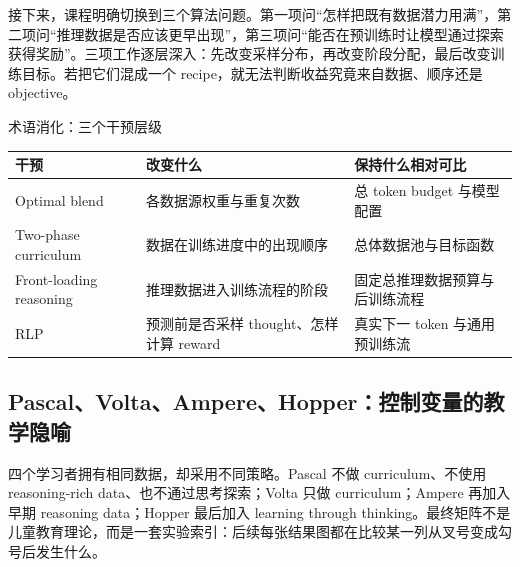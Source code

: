 
接下来，课程明确切换到三个算法问题。第一项问“怎样把既有数据潜力用满”，第二项问“推理数据是否应该更早出现”，第三项问“能否在预训练时让模型通过探索获得奖励”。三项工作逐层深入：先改变采样分布，再改变阶段分配，最后改变训练目标。若把它们混成一个 recipe，就无法判断收益究竟来自数据、顺序还是 objective。


\begin{knowledgebox}{术语消化：三个干预层级}
\begin{tabularx}{\textwidth}{L{0.22\textwidth}X X}
\toprule
干预 & 改变什么 & 保持什么相对可比 \\
\midrule
Optimal blend & 各数据源权重与重复次数 & 总 token budget 与模型配置 \\
Two-phase curriculum & 数据在训练进度中的出现顺序 & 总体数据池与目标函数 \\
Front-loading reasoning & 推理数据进入训练流程的阶段 & 固定总推理数据预算与后训练流程 \\
RLP & 预测前是否采样 thought、怎样计算 reward & 真实下一 token 与通用预训练流 \\
\bottomrule
\end{tabularx}
\end{knowledgebox}

\subsection{Pascal、Volta、Ampere、Hopper：控制变量的教学隐喻}

四个学习者拥有相同数据，却采用不同策略。Pascal 不做 curriculum、不使用 reasoning-rich data、也不通过思考探索；Volta 只做 curriculum；Ampere 再加入早期 reasoning data；Hopper 最后加入 learning through thinking。最终矩阵不是儿童教育理论，而是一套实验索引：后续每张结果图都在比较某一列从叉号变成勾号后发生什么。



